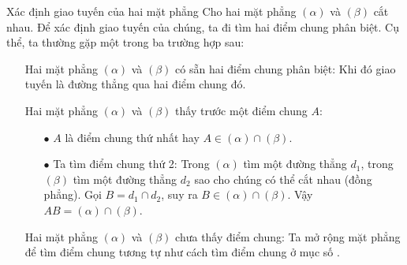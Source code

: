 \begin{dang}{Xác định giao tuyến của hai mặt phẳng}
	Cho hai mặt phẳng $(\alpha)$ và $(\beta)$ cắt nhau. Để xác định giao tuyến của chúng, ta đi tìm hai điểm chung phân biệt. Cụ thể, ta thường gặp một trong ba trường hợp sau:
	\begin{itemize}
		\item [\ding{172}] Hai mặt phẳng $(\alpha)$ và $(\beta)$ có sẵn hai điểm chung phân biệt: Khi đó giao tuyến là đường thẳng qua hai điểm chung đó.
		\item [\ding{173}] Hai mặt phẳng  $(\alpha)$ và $(\beta)$ thấy trước một điểm chung $A$:
		\begin{boxkn}
			\begin{itemize}
				\item [$\bullet$] $A$ là điểm chung thứ nhất hay $A \in (\alpha) \cap (\beta)$.
				\item [$\bullet$] Ta tìm điểm chung thứ 2: Trong $ (\alpha)$ tìm một đường thẳng $d_1$, trong $ (\beta)$ tìm một đường thẳng $d_2$ sao cho chúng có thể cắt nhau (đồng phẳng).			Gọi $B = d_1 \cap d_2$, suy ra $B \in (\alpha) \cap (\beta)$. Vậy $AB=(\alpha) \cap (\beta)$.
			\end{itemize}
		\end{boxkn}
		\item [\ding{174}] Hai mặt phẳng  $(\alpha)$ và $(\beta)$ chưa thấy điểm chung: Ta mở rộng mặt phẳng để tìm điểm chung tương tự như cách tìm điểm chung ở mục số .
	\end{itemize}
\end{dang}

